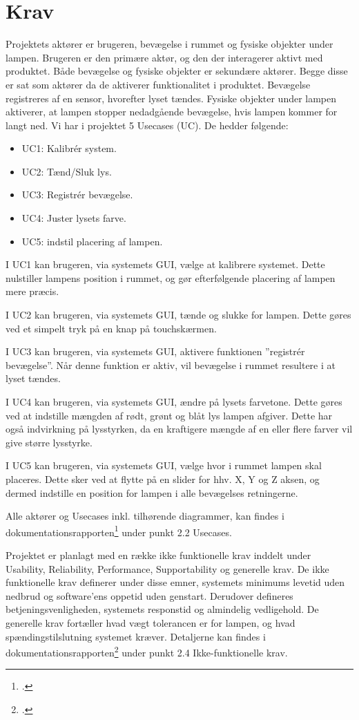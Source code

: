 \chapter{Krav}

Projektets aktører er brugeren, bevægelse i rummet og fysiske objekter under lampen. Brugeren er den primære aktør, og den der interagerer aktivt med produktet. Både bevægelse og fysiske objekter er sekundære aktører. Begge disse er sat som aktører da de aktiverer funktionalitet i produktet. Bevægelse registreres af en sensor, hvorefter lyset tændes. Fysiske objekter under lampen aktiverer, at lampen stopper nedadgående bevægelse, hvis lampen kommer for langt ned.
Vi har i projektet 5 Usecases (UC). De hedder følgende:

\begin{itemize}
    \item UC1: Kalibrér system.
    \item UC2: Tænd/Sluk lys.
    \item UC3: Registrér bevægelse.
    \item UC4: Juster lysets farve.
    \item UC5: indstil placering af lampen.
\end{itemize}

I UC1 kan brugeren, via systemets GUI, vælge at kalibrere systemet. Dette nulstiller lampens position i rummet, og gør efterfølgende placering af lampen mere præcis.

I UC2 kan brugeren, via systemets GUI, tænde og slukke for lampen. Dette gøres ved et simpelt tryk på en knap på touchskærmen.

I UC3 kan brugeren, via systemets GUI, aktivere funktionen ”registrér bevægelse”. Når denne funktion er aktiv, vil bevægelse i rummet resultere i at lyset tændes.

I UC4 kan brugeren, via systemets GUI, ændre på lysets farvetone. Dette gøres ved at indstille mængden af rødt, grønt og blåt lys lampen afgiver. Dette har også indvirkning på lysstyrken, da en kraftigere mængde af en eller flere farver vil give større lysstyrke.

I UC5 kan brugeren, via systemets GUI, vælge hvor i rummet lampen skal placeres. Dette sker ved at flytte på en slider for hhv. X, Y og Z aksen, og dermed indstille en position for lampen i alle bevægelses retningerne.

Alle aktører og Usecases inkl. tilhørende diagrammer, kan findes i dokumentationsrapporten\footcite{documentation} under punkt 2.2 Usecases.

Projektet er planlagt med en række ikke funktionelle krav inddelt under Usability, Reliability, Performance, Supportability og generelle krav. De ikke funktionelle krav definerer under disse emner, systemets minimums levetid uden nedbrud og software’ens oppetid uden genstart. Derudover defineres betjeningsvenligheden, systemets responstid og almindelig vedligehold. De generelle krav fortæller hvad vægt tolerancen er for lampen, og hvad spændingstilslutning systemet kræver. Detaljerne kan findes i dokumentationsrapporten\footcite{documentation} under punkt 2.4 Ikke-funktionelle krav. 
